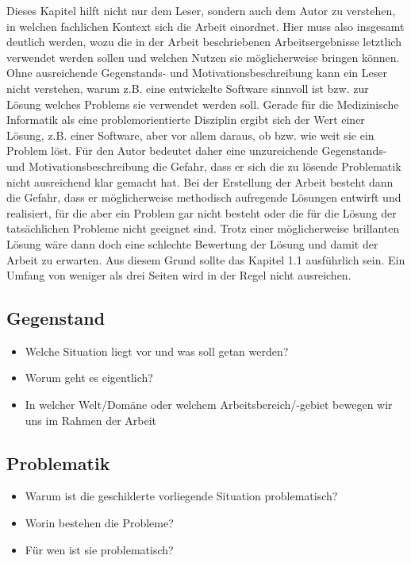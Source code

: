 \documentclass[headsepline,titlepage,twoside,12pt]{report}
\begin{document}
Dieses Kapitel hilft nicht nur dem Leser, sondern auch dem Autor zu verstehen, in welchen fachlichen Kontext sich die Arbeit einordnet. Hier muss also insgesamt deutlich werden, wozu die in der Arbeit beschriebenen Arbeitsergebnisse letztlich verwendet werden sollen und welchen Nutzen sie möglicherweise bringen können.
Ohne ausreichende Gegenstands- und Motivationsbeschreibung kann ein Leser nicht verstehen, warum z.B. eine entwickelte Software sinnvoll ist bzw. zur Lösung welches Problems sie verwendet werden soll. Gerade für die Medizinische Informatik als eine problemorientierte Disziplin ergibt sich der Wert einer Lösung, z.B. einer Software, aber vor allem daraus, ob bzw. wie weit sie ein Problem löst.
Für den Autor bedeutet daher eine unzureichende Gegenstands- und Motivationsbeschreibung die Gefahr, dass er sich die zu lösende Problematik nicht ausreichend klar gemacht hat. Bei der Erstellung der Arbeit besteht dann die Gefahr, dass er möglicherweise methodisch aufregende Lösungen entwirft und realisiert, für die aber ein Problem gar nicht besteht oder die für die Lösung der tatsächlichen Probleme nicht geeignet sind. Trotz einer möglicherweise brillanten Lösung wäre dann doch eine schlechte Bewertung der Lösung und damit der Arbeit zu erwarten.
Aus diesem Grund sollte das Kapitel 1.1 ausführlich sein. Ein Umfang von weniger als drei Seiten wird in der Regel nicht ausreichen.

\subsection{Gegenstand}

\begin{itemize}

\item Welche Situation liegt vor und was soll getan werden?
\item Worum geht es eigentlich?
\item In welcher Welt/Domäne oder welchem Arbeitsbereich/-gebiet bewegen wir uns im Rahmen der Arbeit

\end{itemize}

\subsection{Problematik}
\begin{itemize}
\item Warum ist die geschilderte vorliegende Situation problematisch?
\item Worin bestehen die Probleme?
\item Für wen ist sie problematisch?
\end{itemize}
\end{document}
